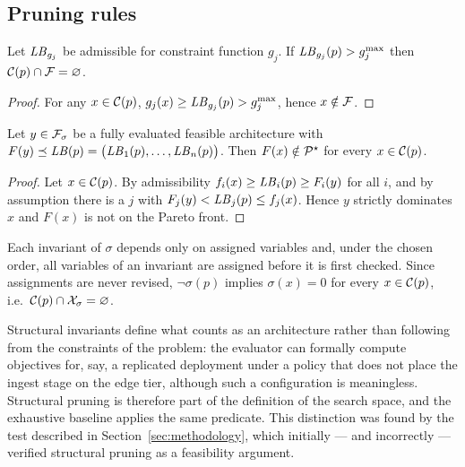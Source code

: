\subsection{Pruning rules}

\begin{proposition}
\label{prop:feas}
Let $\mathit{LB}_{g_j}$ be admissible for constraint function $g_j$. If
$\mathit{LB}_{g_j}(p)>g_j^{\max}$ then $\mathcal{C}(p)\cap\mathcal{F}=\varnothing$.
\end{proposition}
\begin{proof}
For any $x\in\mathcal{C}(p)$, $g_j(x)\ge \mathit{LB}_{g_j}(p)>g_j^{\max}$, hence $x\notin\mathcal{F}$.
\end{proof}

\begin{proposition}
\label{prop:dom}
Let $y\in\mathcal{F}_\sigma$ be a fully evaluated feasible architecture with
$F(y)\preceq \mathit{LB}(p)=\big(\mathit{LB}_1(p),\dots,\mathit{LB}_n(p)\big)$. Then $F(x)\notin\mathcal{P}^{\star}$ for every
$x\in\mathcal{C}(p)$.
\end{proposition}
\begin{proof}
Let $x\in\mathcal{C}(p)$. By admissibility $f_i(x)\ge \mathit{LB}_i(p)\ge F_i(y)$ for all $i$, and by
assumption there is a $j$ with $F_j(y)<\mathit{LB}_j(p)\le f_j(x)$. Hence $y$ strictly dominates
$x$ and $F(x)$ is not on the Pareto front.
\end{proof}

\begin{proposition}
\label{prop:struct}
Each invariant of $\sigma$ depends only on assigned variables and, under the chosen
order, all variables of an invariant are assigned before it is first checked. Since
assignments are never revised, $\neg\sigma(p)$ implies $\sigma(x)=0$ for every
$x\in\mathcal{C}(p)$, i.e.\ $\mathcal{C}(p)\cap\mathcal{X}_\sigma=\varnothing$.
\end{proposition}

\begin{remark}
Structural invariants define what counts as an architecture rather than following from
the constraints of the problem: the evaluator can formally compute objectives for, say, a
replicated deployment under a policy that does not place the ingest stage on the edge
tier, although such a configuration is meaningless. Structural pruning is therefore part
of the definition of the search space, and the exhaustive baseline applies the same
predicate. This distinction was found by the test described in
Section~\ref{sec:methodology}, which initially --- and incorrectly --- verified structural
pruning as a feasibility argument.
\end{remark}

